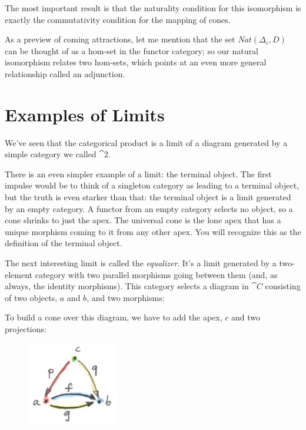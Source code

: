 The most important result is that the naturality condition for this
isomorphism is exactly the commutativity condition for the mapping of
cones.

As a preview of coming attractions, let me mention that the set
$Nat(\Delta_c, D)$ can be thought of as a hom-set in the functor
category; so our natural isomorphism relates two hom-sets, which points
at an even more general relationship called an adjunction.

\section{Examples of Limits}

We've seen that the categorical product is a limit of a diagram
generated by a simple category we called $\cat{2}$.

There is an even simpler example of a limit: the terminal object. The
first impulse would be to think of a singleton category as leading to a
terminal object, but the truth is even starker than that: the terminal
object is a limit generated by an empty category. A functor from an
empty category selects no object, so a cone shrinks to just the apex.
The universal cone is the lone apex that has a unique morphism coming to
it from any other apex. You will recognize this as the definition of the
terminal object.

The next interesting limit is called the \emph{equalizer}. It's a limit
generated by a two-element category with two parallel morphisms going
between them (and, as always, the identity morphisms). This category
selects a diagram in $\cat{C}$ consisting of two objects, $a$ and
$b$, and two morphisms:


To build a cone over this diagram, we have to add the apex, $c$
and two projections:


\begin{figure}[H]
\centering
\includegraphics[width=40mm]{images/equalizercone.jpg}
\end{figure}

